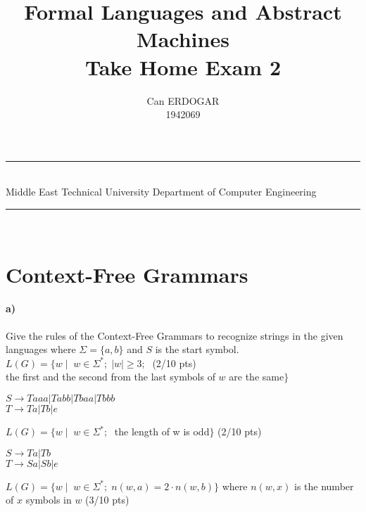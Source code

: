 \documentclass[a4paper,12pt]{article}
\title{Formal Languages and Abstract Machines \\ Take Home Exam 2}
\author{Can ERDOGAR \\ 1942069} %
\date{} %
\newcommand{\HRule}{\rule{\linewidth}{1mm}}
\begin{document}
\HRule\\
Middle East Technical University \hfill Department of Computer Engineering
{\let\newpage\relax\maketitle}
\HRule\\
\vspace{1cm}


\section{Context-Free Grammars \hfill {}}

\paragraph{a)} Give the rules of the Context-Free Grammars to recognize strings in the given languages where $\Sigma=\{a,b\}$ and $S$ is the start symbol. \\  

$L(G)=\{w \mid \;  w \in \Sigma^*;\; |w| \geq 3;\; $  \hfill \small{(2/10 pts)} \\
\hspace*{22mm} the first and the second from the last symbols of $w$ are the same$\}$ \\

\begin{tcolorbox}
$S \rightarrow Taaa | Tabb | Tbaa | Tbbb $ \\
$T \rightarrow Ta | Tb | e$
\vspace{1cm} %
\end{tcolorbox}


$L(G)=\{w \mid \;  w \in \Sigma^*;\; $ the length of w is odd$\}$ \hfill \small{(2/10 pts)} \\

\begin{tcolorbox}
$S \rightarrow Ta | Tb $ \\
$T \rightarrow Sa | Sb | e$
\vspace{1cm} %
\end{tcolorbox}


$L(G)=\{w \mid \;  w \in \Sigma^*;\; n(w,a)=2\cdot n(w,b)\}$ where $n(w,x)$ is the number of $x$ symbols in $w$ \hfill \small{(3/10 pts)} \\
\end{document}
